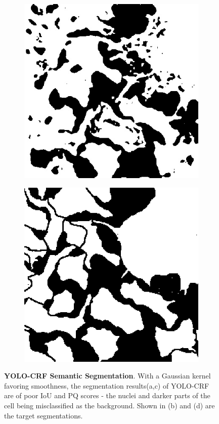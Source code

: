 \documentclass[10pt, journal, compsoc]{IEEEtran}
\begin{document}
\begin{figure}
\begin{subfigure}[b]{0.49\linewidth}
\caption{}
\end{subfigure}
\begin{subfigure}[b]{0.49\linewidth}
\includegraphics[width=\linewidth]{yolocrf/110137.jpg}
\caption{}
\end{subfigure}
\begin{subfigure}[b]{0.49\linewidth}
\includegraphics[width=\linewidth]{yolocrf/110137-label.jpg}
\caption{}
\end{subfigure}
\caption{\textbf{YOLO-CRF Semantic Segmentation}. With a Gaussian kernel favoring smoothness, the segmentation results(a,c) of YOLO-CRF are of poor IoU and PQ scores - the nuclei and darker parts of the cell being misclassified as the background. Shown in (b) and (d) are the target segmentations.}
\label{fig:yolocrf_results}
\end{figure}
\end{document}
